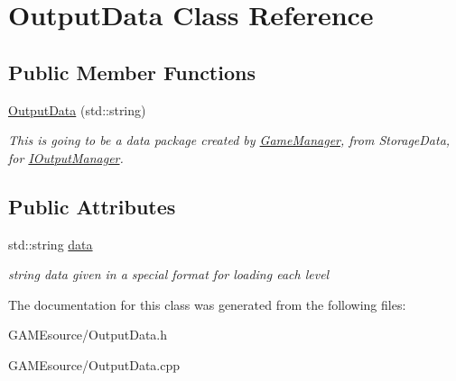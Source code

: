 \hypertarget{class_output_data}{}\section{Output\+Data Class Reference}
\label{class_output_data}
\subsection*{Public Member Functions}
\begin{DoxyCompactItemize}
\item 
\mbox{\label{class_output_data_a66eec456c0579b9945a412bb919f8f08}} 
\mbox{\hyperlink{class_output_data_a66eec456c0579b9945a412bb919f8f08}{Output\+Data}} (std\+::string)
\begin{DoxyCompactList}\small\item\em This is going to be a data package created by \mbox{\hyperlink{class_game_manager}{Game\+Manager}}, from Storage\+Data, for \mbox{\hyperlink{class_i_output_manager}{I\+Output\+Manager}}. \end{DoxyCompactList}\end{DoxyCompactItemize}
\subsection*{Public Attributes}
\begin{DoxyCompactItemize}
\item 
\mbox{\label{class_output_data_aea2c1c5aff5523a159a410ff0e06b6fa}} 
std\+::string \mbox{\hyperlink{class_output_data_aea2c1c5aff5523a159a410ff0e06b6fa}{data}}
\begin{DoxyCompactList}\small\item\em string data given in a special format for loading each level \end{DoxyCompactList}\end{DoxyCompactItemize}


The documentation for this class was generated from the following files\+:\begin{DoxyCompactItemize}
\item 
G\+A\+M\+Esource/Output\+Data.\+h\item 
G\+A\+M\+Esource/Output\+Data.\+cpp\end{DoxyCompactItemize}
